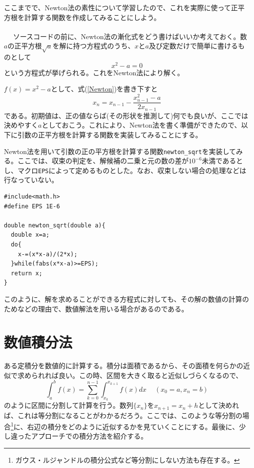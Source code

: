 ここまでで、Newton法の素性について学習したので、これを実際に使って正平方根を計算する関数を作成してみることにしよう。
\\ \\　
ソースコードの前に、Newton法の漸化式をどう書けばいいか考えておく。数$a$の正平方根$\sqrt{a}$を解に持つ方程式のうち、$x$と$a$及び定数だけで簡単に書けるものとして
\begin{equation}
x^2-a=0
\end{equation}
という方程式が挙げられる。これをNewton法により解く。

$f(x)=x^2-a$として、式(\ref{Newton})を書き下すと
\begin{equation}
x_{n}=x_{n-1}-\frac{x_{n-1}^2-a}{2x_{n-1}}
\end{equation}
である。初期値は、正の値ならば(その形状を推測して)何でも良いが、ここでは決めやすく$a$としておこう。これにより、Newton法を書く準備ができたので、以下に引数の正平方根を計算する関数を実装してみることにする。
\begin{boxnote}
\begin{multicols}{2}
Newton法を用いて引数の正の平方根を計算する関数\verb|newton_sqrt|を実装してみる。ここでは、収束の判定を、解候補の二乗と元の数の差が$10^{-6}$未満であるとし、マクロ\verb|EPS|によって定めるものとした。なお、収束しない場合の処理などは行なっていない。
\begin{lstlisting}[caption=Newton法による開平,label=program15_1]
#include<math.h>
#define EPS 1E-6

double newton_sqrt(double a){
  double x=a;
  do{
    x-=(x*x-a)/(2*x);
  }while(fabs(x*x-a)>=EPS);
  return x;
}
\end{lstlisting}
\end{multicols}
\end{boxnote}

このように、解を求めることができる方程式に対しても、その解の数値の計算のためなどの理由で、数値解法を用いる場合があるのである。

\section{数値積分法}
ある定積分を数値的に計算する。積分は面積であるから、その面積を何らかの近似で求められれば良い。この時、区間を大きく取ると近似しづらくなるので、
\begin{equation}
\int^{b}_{a} f(x)=\sum^{n-1}_{k=0}\int^{x_{k+1}}_{x_k}f(x)dx \ \quad(x_0=a,x_n=b) \label{integrals}
\end{equation}
のように区間に分割して計算を行う。数列$\{x_n\}$を$x_{n+1}=x_n+h$として決めれば、これは等分割になることがわかるだろう。ここでは、このような等分割の場合\footnote{ガウス・ルジャンドルの積分公式など等分割にしない方法も存在する。}に、右辺の積分をどのように近似するかを見ていくことにする。最後に、少し違ったアプローチでの積分方法を紹介する。


